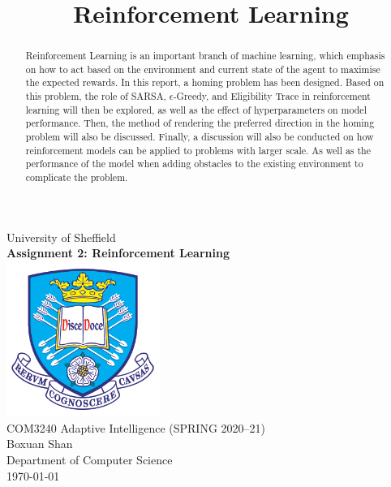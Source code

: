 \documentclass[conference]{IEEEtran}
\begin{document}
\begin{titlepage}


    \begin{center}
        {\LARGE University of Sheffield}\\[1.5cm]
        \linespread{1.2}\huge {\bfseries Assignment 2: Reinforcement Learning}\\[1.5cm]
        \linespread{1}
        \includegraphics[width=5cm]{images/tuoslogo.png}\\[1cm]
        {\large COM3240 Adaptive Intelligence (SPRING 2020--21)}\\[1cm]
        {\Large Boxuan Shan}\\[6cm]
        \large Department of Computer Science\\[1cm]
        \today
    \end{center}

\end{titlepage}

\title{Reinforcement Learning}

\author{
}

\maketitle

\thispagestyle{plain}
\pagestyle{plain}

\begin{abstract}
    Reinforcement Learning is an important branch of machine learning, which emphasis on how to act based on the environment and current state of the agent to maximise the expected rewards. In this report, a homing problem has been designed. Based on this problem, the role of SARSA, \({\epsilon}\)-Greedy, and Eligibility Trace in reinforcement learning will then be explored, as well as the effect of hyperparameters on model performance. Then, the method of rendering the preferred direction in the homing problem will also be discussed. Finally, a discussion will also be conducted on how reinforcement models can be applied to problems with larger scale. As well as the performance of the model when adding obstacles to the existing environment to complicate the problem.
\end{abstract}
\end{document}
